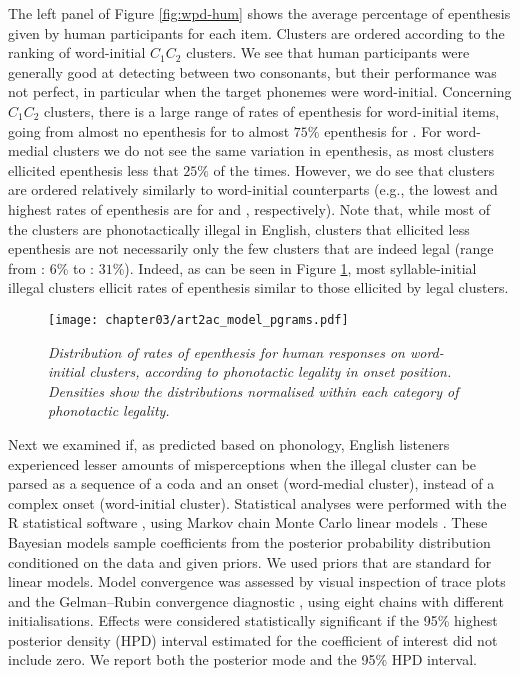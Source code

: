 {The left panel of Figure \ref{fig:wpd-hum} shows the average percentage of epenthesis given by human participants for each item. Clusters are ordered according to the ranking of word-initial $C_{1}C_{2}$ clusters. We see that human participants were generally good at detecting \textipa{[@]} between two consonants, but their performance was not perfect, in particular when the target phonemes were word-initial. Concerning $C_{1}C_{2}$ clusters, there is a large range of rates of epenthesis for word-initial items, going from almost no epenthesis for  to almost $75\%$ epenthesis for . For word-medial clusters we do not see the same variation in epenthesis, as most clusters ellicited epenthesis less that $25\%$ of the times. However, we do see that clusters are ordered relatively similarly to word-initial counterparts (e.g., the lowest and highest rates of epenthesis are for  and , respectively). Note that, while most of the clusters are phonotactically illegal in English, clusters that ellicited less epenthesis are not necessarily only the few clusters that are indeed legal (range from : $6\%$ to : $31\%$). Indeed, as can be seen in Figure \ref{fig:wpd-legal}, most syllable-initial illegal clusters ellicit rates of epenthesis similar to those ellicited by legal clusters. 

\begin{figure}[htb!]
  \centering
    \texttt{[image: chapter03/art2ac\_model\_pgrams.pdf]}    \caption{\textit{Distribution of rates of epenthesis for human responses on word-initial clusters, according to phonotactic legality in onset position. Densities show the distributions normalised within each category of phonotactic legality.}}
    \label{fig:wpd-legal}
  \end{figure}

  Next we examined if, as predicted based on phonology, English listeners experienced lesser amounts of misperceptions when the illegal cluster can be parsed as a sequence of a coda and an onset (word-medial cluster), instead of a complex onset (word-initial cluster). 
Statistical analyses were performed with the R statistical software \cite{R-base}, using Markov chain Monte Carlo linear models \cite{R-MCMCglmm, R-coda}. These Bayesian models sample coefficients from the posterior probability distribution conditioned on the data and given priors. We used priors that are standard for linear models. Model convergence was assessed by visual inspection of trace plots and the Gelman–Rubin convergence diagnostic \cite{gelman1992}, using eight chains with different initialisations. Effects were considered statistically significant if the 95\% highest posterior density (HPD) interval estimated for the coefficient of interest did not include zero. We report both the posterior mode and the 95\% HPD interval.  

}
